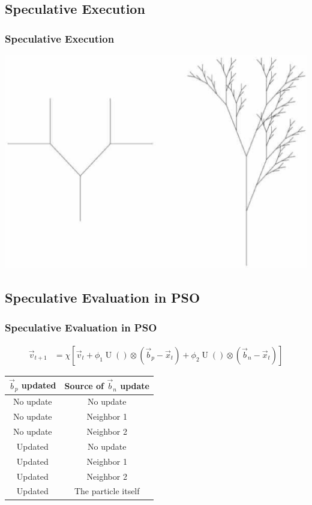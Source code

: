 \documentclass{beamer}
\DeclareMathOperator{\URand}{U}
\providecommand{\ppos}{\ensuremath{\Vec{x}}}
\providecommand{\pvel}{\ensuremath{\Vec{v}}}
\providecommand{\nbest}{\ensuremath{\Vec{b}_n}}
\providecommand{\pbest}{\ensuremath{\Vec{b}_p}}
\providecommand{\constriction}{\ensuremath{\chi}}
\providecommand{\coeff}{\ensuremath{\phi}}
\begin{document}
\subsection{Speculative Execution}
\begin{frame}
  \frametitle{Speculative Execution}
  \includegraphics[width=\textwidth]{branching}
\end{frame}

\subsection{Speculative Evaluation in PSO}
\begin{frame}
  \frametitle{Speculative Evaluation in PSO}
  \begin{align*}
	  \pvel_{t+1} &=
		  \constriction \left[ \pvel_t +
			  \coeff_1\URand()\otimes(\pbest - \ppos_t) +
			  \coeff_2\URand()\otimes(\nbest - \ppos_t)
		  \right]
  \end{align*}
  \pause
  \begin{center}
	\begin{tabular}{cc}
	  $\pbest$ updated&Source of $\nbest$ update\\
	  \hline
	  \hline
	  No update&No update\\
	  \hline
	  No update&Neighbor 1\\
	  \hline
	  No update&Neighbor 2\\
	  \hline
	  Updated&No update\\
	  \hline
	  Updated&Neighbor 1\\
	  \hline
	  Updated&Neighbor 2\\
	  \hline
	  Updated&The particle itself\\
	  \hline
	\end{tabular}
  \end{center}
\end{frame}
\end{document}
